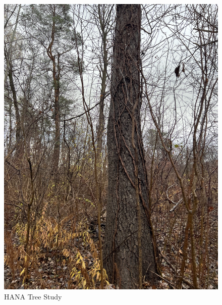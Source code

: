 \documentclass{article}
\begin{document}
\begin{figure}[h!]
\centering
\includegraphics[scale=.1]{Research/HANA/NOV2024/IMG_9856.JPG}
\caption{HANA Tree Study}
\label{fig:HANA}
\end{figure}
\end{document}
